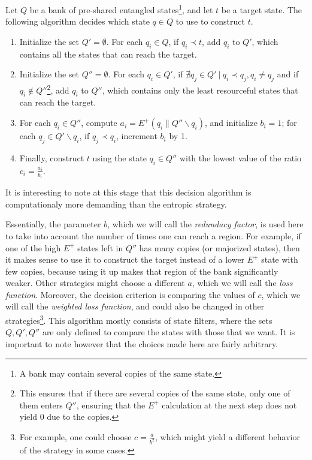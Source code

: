 \begin{definition} \label{strat:unique_entropy}
    Let $Q$ be a bank of pre-shared entangled states\footnote{A bank may contain several copies of the same state.}, and let $t$ be a target state. The following algorithm decides which state $q \in Q$ to use to construct $t$.
    \begin{enumerate}
        \item Initialize the set $Q' = \emptyset$. For each $q_i \in Q$, if $q_i \prec t$, add $q_i$ to $Q'$, which contains all the states that can reach the target.
        \item Initialize the set $Q'' = \emptyset$. For each $q_i \in Q'$, if $\nexists q_j \in Q' \: | \: q_i \prec q_j, q_i \neq q_j$ and if $q_i \notin Q''$\footnote{This ensures that if there are several copies of the same state, only one of them enters $Q''$, ensuring that the $E^+$ calculation at the next step does not yield 0 due to the copies.}, add $q_i$ to $Q''$, which contains only the least resourceful states that can reach the target.
        \item For each $q_i \in Q''$, compute $a_i = E^+(q_i \parallel Q'' \backslash q_i)$, and initialize $b_i = 1$; for each $q_j \in Q' \backslash q_i$, if $q_j \prec q_i$, increment $b_i$ by 1. \label{step:volume}
        \item Finally, construct $t$ using the state $q_i \in Q''$ with the lowest value of the ratio $c_i = \frac{a_i}{b_i}$.
    \end{enumerate}
\end{definition}

\noindent It is interesting to note at this stage that this decision algorithm is computationaly more demanding than the entropic strategy.

Essentially, the parameter $b$, which we will call the \textit{redundacy factor}, is used here to take into account the number of times one can reach a region. For example, if one of the high $E^+$ states left in $Q''$ has many copies (or majorized states), then it makes sense to use it to construct the target instead of a lower $E^+$ state with few copies, because using it up makes that region of the bank significantly weaker. Other strategies might choose a different $a$, which we will call the \textit{loss function}. Moreover, the decision criterion is comparing the values of $c$, which we will call the \textit{weighted loss function}, and could also be changed in other strategies\footnote{For example, one could choose $c = \frac{a}{b^2}$, which might yield a different behavior of the strategy in some cases.}.%
This algorithm mostly consists of state filters, where the sets $Q, Q', Q''$ are only defined to compare the states with those that we want. It is important to note however that the choices made here are fairly arbitrary.

